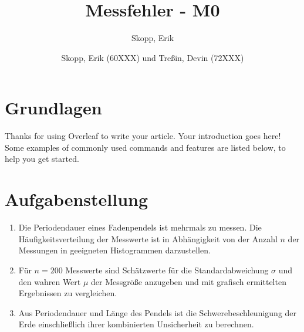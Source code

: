 \documentclass[fleqn,10pt]{olplainarticle}
\title{Messfehler - M0}
\author[1]{Skopp, Erik}
\author[2]{Skopp, Erik (60XXX) und Treßin, Devin (72XXX)}
\begin{document}
\flushbottom
\maketitle
\thispagestyle{empty}

\section*{Grundlagen}

Thanks for using Overleaf to write your article. Your introduction goes here! Some examples of commonly used commands and features are listed below, to help you get started.

\section{Aufgabenstellung}
\begin{enumerate}
    \item Die Periodendauer eines Fadenpendels ist mehrmals zu messen. Die Häufigkeitsverteilung der Messwerte ist in Abhängigkeit von der Anzahl $n$ der Messungen in geeigneten Histogrammen darzustellen. 

    \item Für $n = 200 $ Messwerte sind Schätzwerte für die Standardabweichung $ \sigma $  und den wahren Wert $\mu $ der Messgröße anzugeben und mit grafisch ermittelten Ergebnissen zu vergleichen. 

    \item  Aus Periodendauer und Länge des Pendels ist die Schwerebeschleunigung der Erde einschließlich ihrer kombinierten Unsicherheit zu berechnen. 
\end{enumerate}
\end{document}
